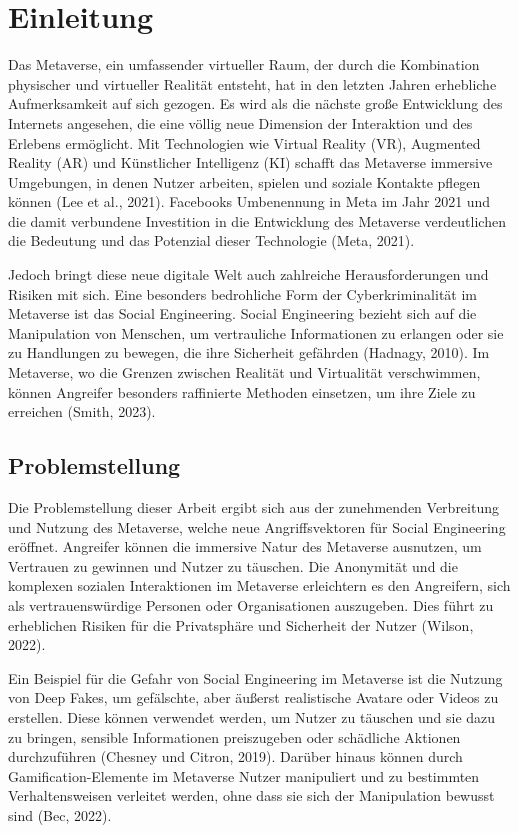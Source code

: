 \chapter{Einleitung}\label{ch:Einleitung}

Das Metaverse, ein umfassender virtueller Raum, der durch die Kombination physischer und virtueller Realität entsteht, hat in den letzten Jahren erhebliche Aufmerksamkeit auf sich gezogen. Es wird als die nächste große Entwicklung des Internets angesehen, die eine völlig neue Dimension der Interaktion und des Erlebens ermöglicht. Mit Technologien wie Virtual Reality (VR), Augmented Reality (AR) und Künstlicher Intelligenz (KI) schafft das Metaverse immersive Umgebungen, in denen Nutzer arbeiten, spielen und soziale Kontakte pflegen können (Lee et al., 2021). Facebooks Umbenennung in Meta im Jahr 2021 und die damit verbundene Investition in die Entwicklung des Metaverse verdeutlichen die Bedeutung und das Potenzial dieser Technologie (Meta, 2021).

Jedoch bringt diese neue digitale Welt auch zahlreiche Herausforderungen und Risiken mit sich. Eine besonders bedrohliche Form der Cyberkriminalität im Metaverse ist das Social Engineering. Social Engineering bezieht sich auf die Manipulation von Menschen, um vertrauliche Informationen zu erlangen oder sie zu Handlungen zu bewegen, die ihre Sicherheit gefährden (Hadnagy, 2010). Im Metaverse, wo die Grenzen zwischen Realität und Virtualität verschwimmen, können Angreifer besonders raffinierte Methoden einsetzen, um ihre Ziele zu erreichen (Smith, 2023).


\section{Problemstellung}
Die Problemstellung dieser Arbeit ergibt sich aus der zunehmenden Verbreitung und Nutzung des Metaverse, welche neue Angriffsvektoren für Social Engineering eröffnet. Angreifer können die immersive Natur des Metaverse ausnutzen, um Vertrauen zu gewinnen und Nutzer zu täuschen. Die Anonymität und die komplexen sozialen Interaktionen im Metaverse erleichtern es den Angreifern, sich als vertrauenswürdige Personen oder Organisationen auszugeben. Dies führt zu erheblichen Risiken für die Privatsphäre und Sicherheit der Nutzer (Wilson, 2022).

Ein Beispiel für die Gefahr von Social Engineering im Metaverse ist die Nutzung von Deep Fakes, um gefälschte, aber äußerst realistische Avatare oder Videos zu erstellen. Diese können verwendet werden, um Nutzer zu täuschen und sie dazu zu bringen, sensible Informationen preiszugeben oder schädliche Aktionen durchzuführen (Chesney und Citron, 2019). Darüber hinaus können durch Gamification-Elemente im Metaverse Nutzer manipuliert und zu bestimmten Verhaltensweisen verleitet werden, ohne dass sie sich der Manipulation bewusst sind (Bec, 2022).

